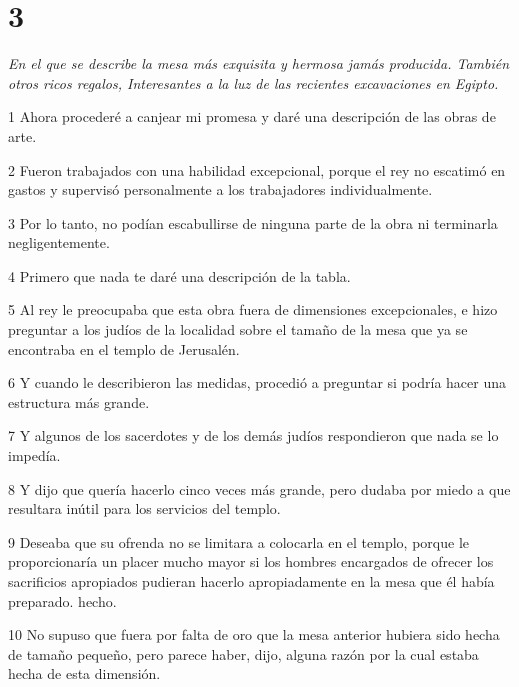 \chapter{3}

\par \textit{En el que se describe la mesa más exquisita y hermosa jamás producida. También otros ricos regalos, Interesantes a la luz de las recientes excavaciones en Egipto.}

\par 1 Ahora procederé a canjear mi promesa y daré una descripción de las obras de arte.

\par 2 Fueron trabajados con una habilidad excepcional, porque el rey no escatimó en gastos y supervisó personalmente a los trabajadores individualmente.

\par 3 Por lo tanto, no podían escabullirse de ninguna parte de la obra ni terminarla negligentemente.

\par 4 Primero que nada te daré una descripción de la tabla.

\par 5 Al rey le preocupaba que esta obra fuera de dimensiones excepcionales, e hizo preguntar a los judíos de la localidad sobre el tamaño de la mesa que ya se encontraba en el templo de Jerusalén.

\par 6 Y cuando le describieron las medidas, procedió a preguntar si podría hacer una estructura más grande.

\par 7 Y algunos de los sacerdotes y de los demás judíos respondieron que nada se lo impedía.

\par 8 Y dijo que quería hacerlo cinco veces más grande, pero dudaba por miedo a que resultara inútil para los servicios del templo.

\par 9 Deseaba que su ofrenda no se limitara a colocarla en el templo, porque le proporcionaría un placer mucho mayor si los hombres encargados de ofrecer los sacrificios apropiados pudieran hacerlo apropiadamente en la mesa que él había preparado. hecho.

\par 10 No supuso que fuera por falta de oro que la mesa anterior hubiera sido hecha de tamaño pequeño, pero parece haber, dijo, alguna razón por la cual estaba hecha de esta dimensión.

